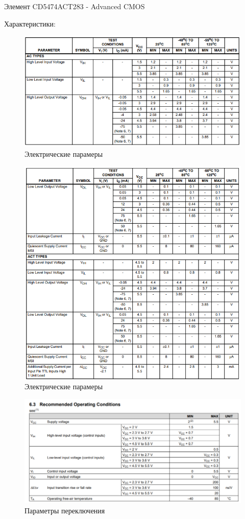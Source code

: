 Элемент CD5474ACT283 - Advanced CMOS

Характеристики:

\begin{figure}[H]
	\centering
	\includegraphics[width=0.95\linewidth]{imgs/5/ti1}
	\caption{Электрические парамеры}
	\label{fig:5_ti1}
\end{figure}

\begin{figure}[H]
	\centering
	\includegraphics[width=0.95\linewidth]{imgs/5/ti2}
	\caption{Электрические парамеры}
	\label{fig:5_ti2}
\end{figure}

\begin{figure}[H]
	\centering
	\includegraphics[width=0.95\linewidth]{imgs/4/ti3}
	\caption{Параметры переключения}
	\label{fig:5_ti3}
\end{figure}
